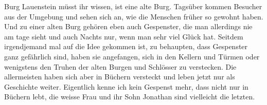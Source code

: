 Burg Lauenstein müsst ihr wissen, ist eine alte Burg. Tagsüber kommen Besucher aus der Umgebung und sehen sich an, wie die Menschen früher so gewohnt haben. Und zu einer alten Burg gehören eben auch Gespenster, die man allerdings nie am tage sieht und auch Nachts nur, wenn man sehr viel Glück hat. Seitdem irgendjemand mal auf die Idee gekommen ist, zu behaupten, dass Gespenster ganz gefährlich sind, haben sie angefangen, sich in den Kellern und Türmen oder wenigstens den Truhen der alten Burgen und Schlösser zu verstecken. Die allermeisten haben sich aber in Büchern versteckt und leben jetzt nur als Geschichte weiter. Eigentlich kenne ich kein Gespenst mehr, dass nicht nur in Büchern lebt, die weisse Frau und ihr Sohn Jonathan sind vielleicht die letzten.



